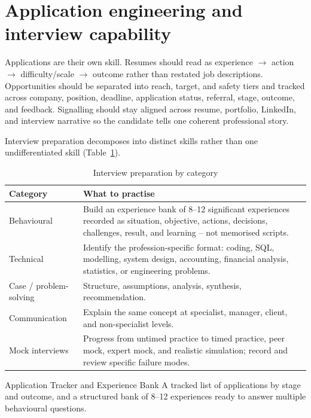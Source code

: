 \documentclass{reportkit}
\begin{document}
\section{Application engineering and interview capability}
Applications are their own skill. Resumes should read as experience $\to$ action
$\to$ difficulty/scale $\to$ outcome rather than restated job descriptions.
Opportunities should be separated into reach, target, and safety tiers and tracked
across company, position, deadline, application status, referral, stage, outcome, and
feedback. Signalling should stay aligned across resume, portfolio, LinkedIn, and
interview narrative so the candidate tells one coherent professional story.

Interview preparation decomposes into distinct skills rather than one undifferentiated
skill (Table~\ref{tab:interview}).

\begin{table}[H]
\caption{Interview preparation by category}
\label{tab:interview}
\centering
\begin{tabular}{lp{7.6cm}}
\toprule
Category & What to practise \\
\midrule
Behavioural & Build an experience bank of 8--12 significant experiences recorded as
  situation, objective, actions, decisions, challenges, result, and learning -- not
  memorised scripts. \\
Technical & Identify the profession-specific format: coding, SQL, modelling, system
  design, accounting, financial analysis, statistics, or engineering problems. \\
Case / problem-solving & Structure, assumptions, analysis, synthesis,
  recommendation. \\
Communication & Explain the same concept at specialist, manager, client, and
  non-specialist levels. \\
Mock interviews & Progress from untimed practice to timed practice, peer mock,
  expert mock, and realistic simulation; record and review specific failure
  modes. \\
\bottomrule
\end{tabular}
\end{table}

\begin{deliverablenote}{Application Tracker and Experience Bank}
A tracked list of applications by stage and outcome, and a structured bank of 8--12
experiences ready to answer multiple behavioural questions.
\end{deliverablenote}
\end{document}
